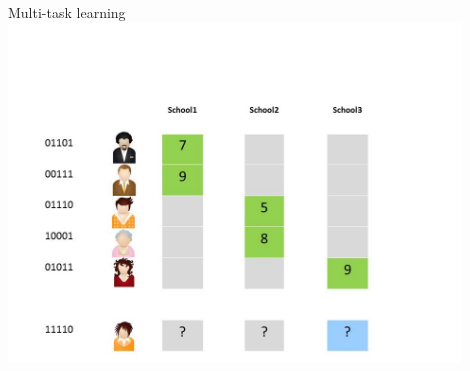 \documentclass[]{beamer}
\renewcommand{\emph}[1]{\textbf{\color{putblue}#1}}
\begin{document}
\begin{frame}{Multi-task learning}
\includegraphics[width=0.9\textwidth,trim = 0 0 100 100,clip]{Figures/pictures/Slide3}
\end{frame}

%
%
%
%
%
\end{document}
